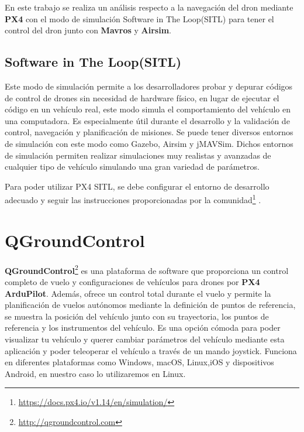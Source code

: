 En este trabajo se realiza un análisis respecto a la navegación del dron mediante \textbf{PX4} con el modo de simulación Software in The Loop(SITL) para tener el control del dron junto con 
\textbf{Mavros} y \textbf{Airsim}.\newline
\subsection{Software in The Loop(SITL)}
\label{sec:px4 sitl} 
Este modo de simulación permite a los desarrolladores probar y depurar códigos de control de drones sin necesidad de hardware físico, en lugar de ejecutar el código en un 
vehículo real, este modo simula el comportamiento del vehículo en una computadora. Es especialmente útil durante el desarrollo y la validación de control, navegación y 
planificación de misiones.
Se puede tener diversos entornos de simulación con este modo como Gazebo, Airsim y jMAVSim. Dichos entornos de simulación permiten realizar simulaciones muy realistas y avanzadas 
de cualquier tipo de vehículo simulando una gran variedad de parámetros.\newline

Para poder utilizar PX4 SITL, se debe configurar el entorno de desarrollo adecuado y seguir las instrucciones proporcionadas por la comunidad\footnote{\url{https://docs.px4.io/v1.14/en/simulation/}} .


\section{QGroundControl}
\label{sec:QGroundControl} 

\textbf{QGroundControl}\footnote{\url{http://qgroundcontrol.com}} es una plataforma de software que proporciona un control completo de vuelo 
y configuraciones de vehículos para drones por \textbf{PX4 ArduPilot}. Además, ofrece un control total durante el vuelo y permite la planificación de vuelos autónomos 
mediante la definición de puntos de referencia, se muestra la posición del vehículo junto con su trayectoria, los puntos de referencia y los instrumentos del vehículo. 
Es una opción cómoda para poder visualizar tu vehículo y querer cambiar parámetros del vehículo mediante esta aplicación y poder teleoperar el vehículo a través de un mando joystick.
Funciona en diferentes plataformas como Windows, macOS, Linux,iOS y dispositivos Android, en nuestro caso lo utilizaremos en Linux. \newline

